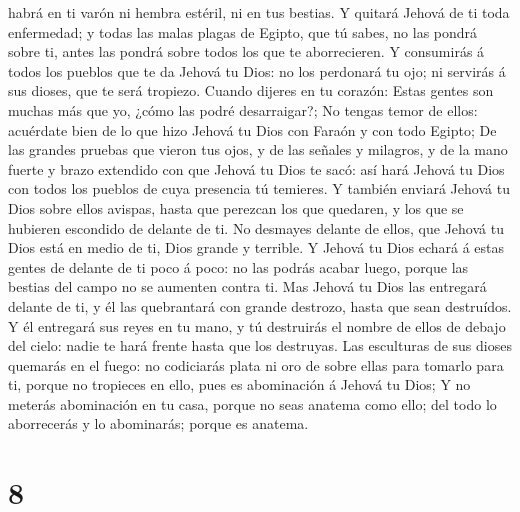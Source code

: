 habrá en ti varón ni hembra estéril, ni en tus bestias.  Y
quitará Jehová de ti toda enfermedad; y todas las malas plagas de
Egipto, que tú sabes, no las pondrá sobre ti, antes las pondrá sobre
todos los que te aborrecieren.  Y consumirás á todos los
pueblos que te da Jehová tu Dios: no los perdonará tu ojo; ni servirás á
sus dioses, que te será tropiezo.  Cuando dijeres en tu
corazón: Estas gentes son muchas más que yo, ¿cómo las podré
desarraigar?;  No tengas temor de ellos: acuérdate bien de
lo que hizo Jehová tu Dios con Faraón y con todo Egipto; 
De las grandes pruebas que vieron tus ojos, y de las señales y milagros,
y de la mano fuerte y brazo extendido con que Jehová tu Dios te sacó:
así hará Jehová tu Dios con todos los pueblos de cuya presencia tú
temieres.  Y también enviará Jehová tu Dios sobre ellos
avispas, hasta que perezcan los que quedaren, y los que se hubieren
escondido de delante de ti.  No desmayes delante de ellos,
que Jehová tu Dios está en medio de ti, Dios grande y terrible.
 Y Jehová tu Dios echará á estas gentes de delante de ti
poco á poco: no las podrás acabar luego, porque las bestias del campo no
se aumenten contra ti.  Mas Jehová tu Dios las entregará
delante de ti, y él las quebrantará con grande destrozo, hasta que sean
destruídos.  Y él entregará sus reyes en tu mano, y tú
destruirás el nombre de ellos de debajo del cielo: nadie te hará frente
hasta que los destruyas.  Las esculturas de sus dioses
quemarás en el fuego: no codiciarás plata ni oro de sobre ellas para
tomarlo para ti, porque no tropieces en ello, pues es abominación á
Jehová tu Dios;  Y no meterás abominación en tu casa,
porque no seas anatema como ello; del todo lo aborrecerás y lo
abominarás; porque es anatema.

\hypertarget{section-7}{%
\section{8}\label{section-7}}

